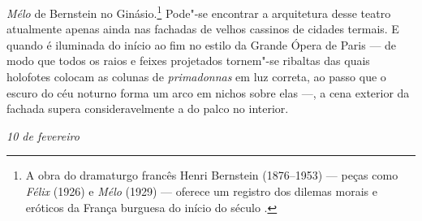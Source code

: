 \emph{Mélo} de Bernstein no Ginásio.\footnote{A obra do dramaturgo francês Henri Bernstein (1876--1953) --- peças como
  \emph{Félix} (1926) e \emph{Mélo} (1929) --- oferece um registro dos
  dilemas morais e eróticos da França burguesa do início do século . \versal{[N.~O.]}}
Pode"-se encontrar a arquitetura desse teatro atualmente apenas ainda nas
fachadas de velhos cassinos de cidades termais. E quando é iluminada
do início ao fim no estilo da Grande Ópera de Paris --- de
modo que todos os raios e feixes projetados tornem"-se ribaltas das quais
holofotes colocam as colunas de \emph{primadonnas} em luz correta, ao
passo que o escuro do céu noturno forma um arco em nichos sobre elas ---,
a cena exterior da fachada supera consideravelmente a do palco no
interior.


\begin{flushright}
\emph{10 de fevereiro}
\end{flushright}

